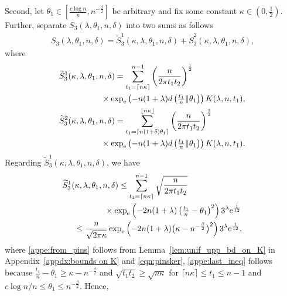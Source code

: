 \documentclass[journal, 10pt]{IEEEtran}
\newcommand{\rme}{\mathrm{e}}
\theoremstyle{plain}
\theoremstyle{plain}
\theoremstyle{plain}
\theoremstyle{plain}
\begin{document}
\begin{appendices}
\begin{IEEEproof}
Second, let $\theta_1\in \left[ \frac{c\log n}{n} , n^{-\frac{\beta}{2}} \right]$ be arbitrary and fix some constant $ \kappa \in \left(0, \frac{1}{2}\right)$. Further, separate $S_3(\lambda, \theta_1, n, \delta)$ into two sums as follows
\begin{align}
S_3(\lambda, \theta_1, n, \delta)=\widetilde{S}_3^1(\kappa, \lambda, \theta_1, n, \delta)+\widetilde{S}_3^2(\kappa, \lambda, \theta_1, n, \delta)\text{,}
\end{align}
where
\begin{align}
\widetilde{S}_3^1(\kappa, \lambda, \theta_1, n, \delta)
&=
\sum_{t_1=\lceil n\kappa \rceil }^{n-1}  
\left(\frac{n}{2\pi t_1t_2}\right)^\frac12 \\
& \hspace{-6mm} \times \exp_\rme\left(-n(1+\lambda) d\left(\tfrac{t_1}{n}\|\theta_1\right)\right) K(\lambda, n, t_1)\text{,} \nonumber  \\
\widetilde{S}_3^2(\kappa, \lambda, \theta_1, n, \delta) 
&= 
\sum_{t_1=\lceil n(1+\delta)\theta_1 \rceil }^{\lfloor n\kappa \rfloor} \left(\frac{n}{2\pi t_1t_2}\right)^\frac12  \\ 
&\hspace{-6mm} \times \exp_\rme\left(-n(1+\lambda) d\left(\tfrac{t_1}{n}\|\theta_1\right)\right) K(\lambda, n, t_1)\text{.} \nonumber
\end{align}
Regarding $\widetilde{S}_3^1(\kappa, \lambda, \theta_1, n, \delta)$, we have
\begin{align}
\widetilde{S}_3^1(\kappa, \lambda, \theta_1, n, \delta) 
&\le  \sum_{t_1=\lceil n\kappa \rceil }^{n-1}  \sqrt{\frac{n}{2\pi t_1t_2}} \label{appe:from_pins} \\
&\hspace{-6mm} \times \exp_\rme\left(-2n(1+\lambda) \left( \tfrac{t_1}{n}-\theta_1\right)^2\right)3^\lambda\rme^{\frac{1}{12}} \nonumber \\
&\hspace{-19mm} \le 
\frac{n}{\sqrt{2\pi\kappa}} \exp_\rme\left(-2n(1+\lambda) \big( \kappa - n^{-\frac{\beta}{2}} \big)^2\right)3^\lambda \rme^{\frac{1}{12}}\text{,} \label{appe:last_ineq} 
\end{align}
where \eqref{appe:from_pins} follows from Lemma~\ref{lem:unif_upp_bd_on_K} in Appendix~\ref{appdx:bounds on K} and \eqref{eqn:pinsker}, \eqref{appe:last_ineq} follows because $\frac{t_1}{n}-\theta_1 \ge \kappa-n^{-\frac{\beta}{2}} $ and $\sqrt{t_1t_2}\ge \sqrt{n\kappa}$ for $\lceil n\kappa \rceil \le t_1 \le n-1 $ and $c\log n /n\le \theta_1 \le n^{-\frac{\beta}{2}}$. Hence,

\end{IEEEproof}
\end{appendices}
\end{document}
